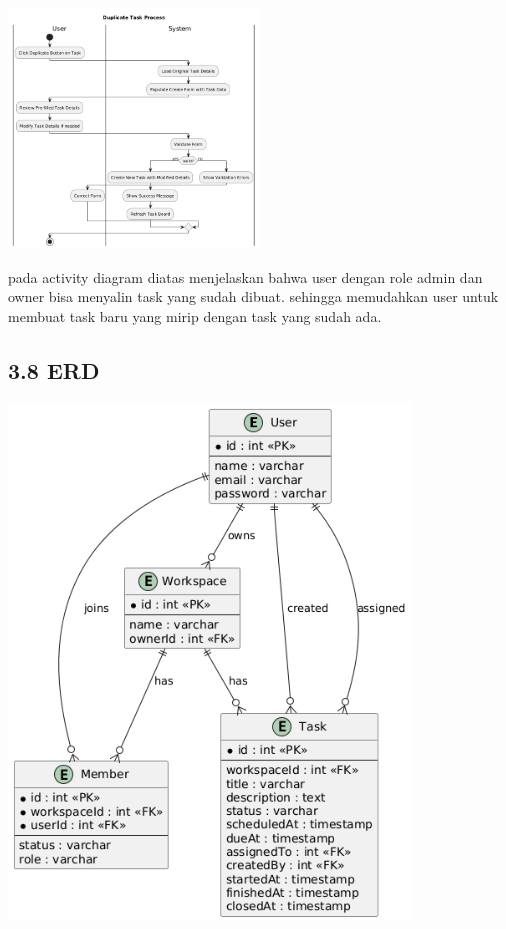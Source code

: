 \begin{center}
    \includegraphics[width=0.5\textwidth]{assets/activity_diagrams/task_duplicate.png}
\end{center}
pada activity diagram diatas menjelaskan bahwa user dengan role admin dan owner bisa menyalin task yang sudah dibuat.
sehingga memudahkan user untuk membuat task baru yang mirip dengan task yang sudah ada.
\subsection*{3.8 ERD}
\begin{center}
  \includegraphics[width=0.8\textwidth]{assets/erd.png}
\end{center}



